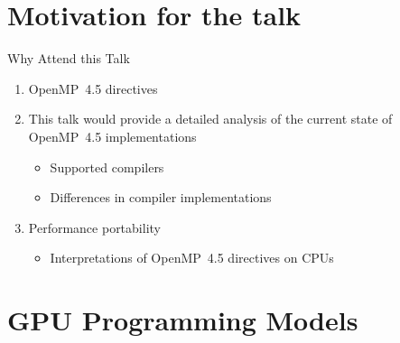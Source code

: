 \documentclass[xcolor=dvipsnames,compress,10pt]{nersc}
\begin{document}
\section{Motivation for the talk}
\begin{frame}{Why Attend this Talk}
\begin{enumerate}
    \setlength\itemsep{1.2em}
    \item OpenMP~4.5 directives
    \item This talk would provide a detailed analysis of the current state of OpenMP~4.5 implementations
    \begin{itemize}
        \item Supported compilers
        \item Differences in compiler implementations
    \end{itemize}
    \item Performance portability
    \begin{itemize}
        \item Interpretations of OpenMP~4.5 directives on CPUs
    \end{itemize}
\end{enumerate}
\end{frame}


\section{GPU Programming Models}
\end{document}

